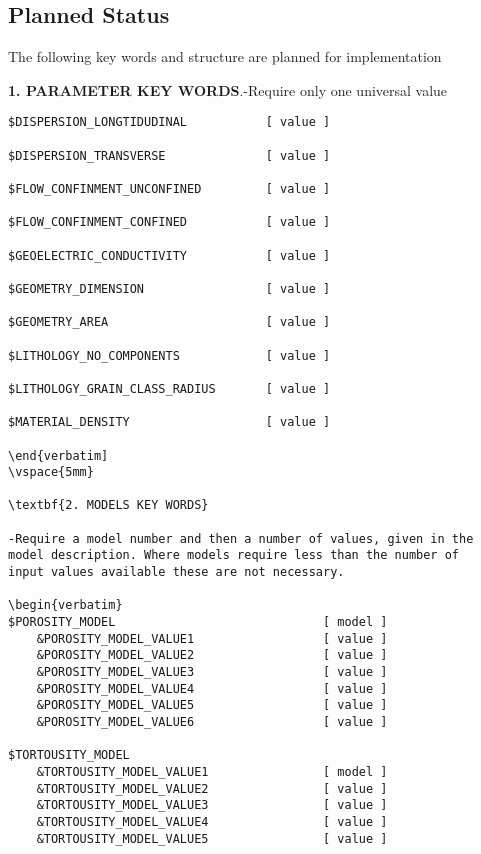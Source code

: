 \subsection{Planned Status}

The following key words and structure are planned for
implementation

\vspace{5mm}

 \textbf{1. PARAMETER KEY WORDS}.-Require
only one universal value

\vspace{5mm}

\begin{verbatim}
$DISPERSION_LONGTIDUDINAL           [ value ]

$DISPERSION_TRANSVERSE              [ value ]

$FLOW_CONFINMENT_UNCONFINED         [ value ]

$FLOW_CONFINMENT_CONFINED           [ value ]

$GEOELECTRIC_CONDUCTIVITY           [ value ]

$GEOMETRY_DIMENSION                 [ value ]

$GEOMETRY_AREA                      [ value ]

$LITHOLOGY_NO_COMPONENTS            [ value ]

$LITHOLOGY_GRAIN_CLASS_RADIUS       [ value ]

$MATERIAL_DENSITY                   [ value ]

\end{verbatim]
\vspace{5mm}

\textbf{2. MODELS KEY WORDS}

-Require a model number and then a number of values, given in the
model description. Where models require less than the number of
input values available these are not necessary.

\begin{verbatim}
$POROSITY_MODEL                             [ model ]
    &POROSITY_MODEL_VALUE1                  [ value ]
    &POROSITY_MODEL_VALUE2                  [ value ]
    &POROSITY_MODEL_VALUE3                  [ value ]
    &POROSITY_MODEL_VALUE4                  [ value ]
    &POROSITY_MODEL_VALUE5                  [ value ]
    &POROSITY_MODEL_VALUE6                  [ value ]

$TORTOUSITY_MODEL
    &TORTOUSITY_MODEL_VALUE1                [ model ]
    &TORTOUSITY_MODEL_VALUE2                [ value ]
    &TORTOUSITY_MODEL_VALUE3                [ value ]
    &TORTOUSITY_MODEL_VALUE4                [ value ]
    &TORTOUSITY_MODEL_VALUE5                [ value ]


\end{verbatim}
